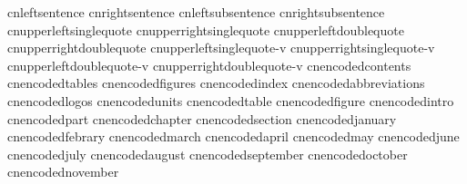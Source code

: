 \startencoding[gbk]
   cnleftsentence            {}
   cnrightsentence           {}
   cnleftsubsentence         {}
   cnrightsubsentence        {}
   cnupperleftsinglequote    {}
   cnupperrightsinglequote   {}
   cnupperleftdoublequote    {}
   cnupperrightdoublequote   {}
   cnupperleftsinglequote-v  {}
   cnupperrightsinglequote-v {}
   cnupperleftdoublequote-v  {}
   cnupperrightdoublequote-v {}
   cnencodedcontents         {}
   cnencodedtables           {}
   cnencodedfigures          {}
   cnencodedindex            {}
   cnencodedabbreviations    {}
   cnencodedlogos            {}
   cnencodedunits            {}
   cnencodedtable            {}
   cnencodedfigure           {}
   cnencodedintro            {}
   cnencodedpart             {}
   cnencodedchapter          {}
   cnencodedsection          {}
   cnencodedjanuary          {}
   cnencodedfebrary          {}
   cnencodedmarch            {}
   cnencodedapril            {}
   cnencodedmay              {}
   cnencodedjune             {}
   cnencodedjuly             {}
   cnencodedaugust           {}
   cnencodedseptember        {}
   cnencodedoctober          {}
   cnencodednovember         {}
